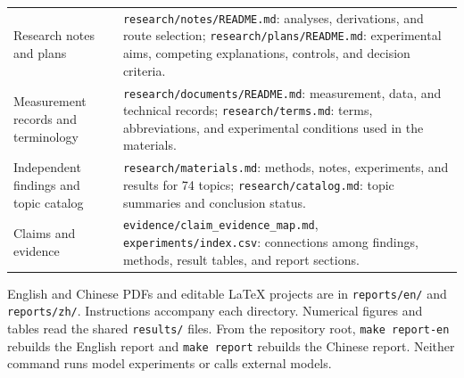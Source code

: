 \begin{longtable}{@{}P{43mm}P{107mm}@{}}
Research notes and plans & \nolinkurl{research/notes/README.md}: analyses, derivations, and route selection; \nolinkurl{research/plans/README.md}: experimental aims, competing explanations, controls, and decision criteria.\\
Measurement records and terminology & \nolinkurl{research/documents/README.md}: measurement, data, and technical records; \nolinkurl{research/terms.md}: terms, abbreviations, and experimental conditions used in the materials.\\
Independent findings and topic catalog & \nolinkurl{research/materials.md}: methods, notes, experiments, and results for 74 topics; \nolinkurl{research/catalog.md}: topic summaries and conclusion status.\\
Claims and evidence & \nolinkurl{evidence/claim_evidence_map.md}, \nolinkurl{experiments/index.csv}: connections among findings, methods, result tables, and report sections.\\
\end{longtable}

English and Chinese PDFs and editable LaTeX projects are in \nolinkurl{reports/en/} and \nolinkurl{reports/zh/}. Instructions accompany each directory. Numerical figures and tables read the shared \nolinkurl{results/} files. From the repository root, \texttt{make report-en} rebuilds the English report and \texttt{make report} rebuilds the Chinese report. Neither command runs model experiments or calls external models.

